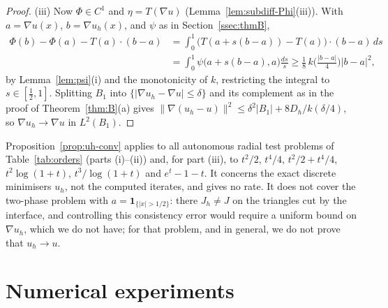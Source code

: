 \documentclass[11pt]{amsart}
\theoremstyle{definition}
\theoremstyle{remark}
\numberwithin{equation}{section}
\newcommand{\abs}[1]{\lvert #1\rvert}
\newcommand{\norm}[1]{\lVert #1\rVert}
\begin{document}
\begin{proof}
(iii) Now $\Phi\in C^1$ and $\eta=T(\nabla u)$ (Lemma~\ref{lem:subdiff-Phi}(iii)). With $a=\nabla u(x)$, $b=\nabla u_h(x)$, and $\psi$ as in Section~\ref{ssec:thmB},
\[
\begin{aligned}
\Phi(b)-\Phi(a)-T(a)\cdot(b-a)&=\int_0^1\big(T(a+s(b-a))-T(a)\big)\cdot(b-a)\,ds\\
&=\int_0^1\psi\big(a+s(b-a),a\big)\frac{ds}s\ge\frac18\,k\Big(\frac{\abs{b-a}}4\Big)\abs{b-a}^2,
\end{aligned}
\]
by Lemma~\ref{lem:psi}(i) and the monotonicity of $k$, restricting the integral to $s\in[\frac12,1]$. Splitting $B_1$ into $\{\abs{\nabla u_h-\nabla u}\le\delta\}$ and its complement as in the proof of Theorem~\ref{thm:B}(a) gives $\norm{\nabla(u_h-u)}^2\le\delta^2\abs{B_1}+8D_h/k(\delta/4)$, so $\nabla u_h\to\nabla u$ in $L^2(B_1)$.
\end{proof}
Proposition~\ref{prop:uh-conv} applies to all autonomous radial test problems of Table~\ref{tab:orders} (parts (i)--(ii)) and, for part (iii), to $t^2/2$, $t^4/4$, $t^2/2+t^4/4$, $t^2\log(1+t)$, $t^3/\log(1+t)$ and $e^t-1-t$. It concerns the exact discrete minimisers $u_h$, not the computed iterates, and gives no rate. It does not cover the two-phase problem with $a=\mathbf 1_{\{\abs x>1/2\}}$: there $J_h\ne J$ on the triangles cut by the interface, and controlling this consistency error would require a uniform bound on $\nabla u_h$, which we do not have; for that problem, and in general, we do not prove that $u_h\to u$.

\section{Numerical experiments}\label{sec:numerics}
\end{document}
